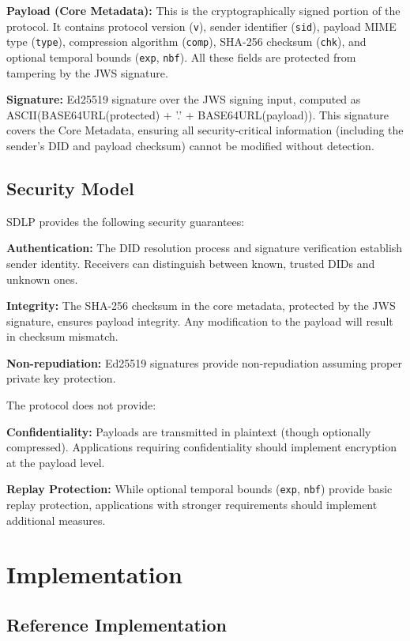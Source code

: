 \documentclass[conference]{IEEEtran}
\begin{document}
\textbf{Payload (Core Metadata):} This is the cryptographically signed portion of the protocol. It contains protocol version (\texttt{v}), sender identifier (\texttt{sid}), payload MIME type (\texttt{type}), compression algorithm (\texttt{comp}), SHA-256 checksum (\texttt{chk}), and optional temporal bounds (\texttt{exp}, \texttt{nbf}). All these fields are protected from tampering by the JWS signature.

\textbf{Signature:} Ed25519 signature over the JWS signing input, computed as ASCII(BASE64URL(protected) + '.' + BASE64URL(payload)). This signature covers the Core Metadata, ensuring all security-critical information (including the sender's DID and payload checksum) cannot be modified without detection.

\subsection{Security Model}

SDLP provides the following security guarantees:

\textbf{Authentication:} The DID resolution process and signature verification establish sender identity. Receivers can distinguish between known, trusted DIDs and unknown ones.

\textbf{Integrity:} The SHA-256 checksum in the core metadata, protected by the JWS signature, ensures payload integrity. Any modification to the payload will result in checksum mismatch.

\textbf{Non-repudiation:} Ed25519 signatures provide non-repudiation assuming proper private key protection.

The protocol does not provide:

\textbf{Confidentiality:} Payloads are transmitted in plaintext (though optionally compressed). Applications requiring confidentiality should implement encryption at the payload level.

\textbf{Replay Protection:} While optional temporal bounds (\texttt{exp}, \texttt{nbf}) provide basic replay protection, applications with stronger requirements should implement additional measures.

\section{Implementation}

\subsection{Reference Implementation}
\end{document}
